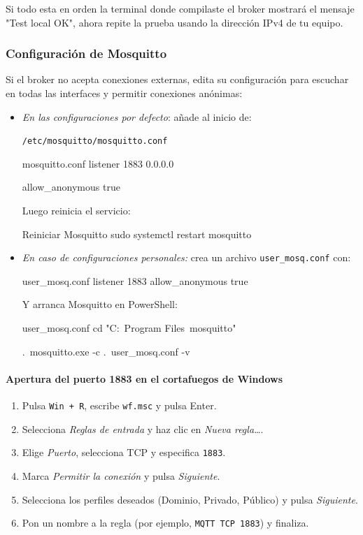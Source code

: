 \documentclass[12pt, a4paper]{article}
\begin{document}
\begin{umaappendices}
		Si todo esta en orden la terminal donde compilaste el broker mostrará el mensaje "Test local OK", ahora repite la prueba usando la dirección IPv4 de tu equipo.
		
		\subsubsection{Configuración de Mosquitto}
		Si el broker no acepta conexiones externas, edita su configuración para escuchar en todas las interfaces y permitir conexiones anónimas:
		
		\begin{itemize}
			\item  \textit{En las configuraciones por defecto}: añade al inicio de:
			
			\texttt{/etc/mosquitto/}\texttt{mosquitto.conf}
			\begin{Terminal}{mosquitto.conf}
				listener 1883 0.0.0.0 
				 
				allow\_anonymous true
			\end{Terminal}
			Luego reinicia el servicio:
			\begin{Terminal}{Reiniciar Mosquitto}
				sudo systemctl restart mosquitto
			\end{Terminal}
			
			\item \textit{En caso de configuraciones personales:} crea un archivo \texttt{user\_mosq.conf} con:
			\begin{Terminal}{user\_mosq.conf}
				listener 1883  
				allow\_anonymous true
			\end{Terminal}
			Y arranca Mosquitto en PowerShell:
			\begin{Terminal}{user\_mosq.conf}
				cd "C:\ Program Files\ mosquitto"  
				
				.\ mosquitto.exe -c .\ user\_mosq.conf -v
			\end{Terminal}
		\end{itemize}
		
		\paragraph{Apertura del puerto 1883 en el cortafuegos de Windows}
			\begin{enumerate}
				\item Pulsa \texttt{Win + R}, escribe \texttt{wf.msc} y pulsa Enter.
				\item Selecciona \textit{Reglas de entrada} y haz clic en \textit{Nueva regla…}.
				\item Elige \textit{Puerto}, selecciona TCP y especifica \texttt{1883}.
				\item Marca \textit{Permitir la conexión} y pulsa \textit{Siguiente}.
				\item Selecciona los perfiles deseados (Dominio, Privado, Público) y pulsa \textit{Siguiente}.
				\item Pon un nombre a la regla (por ejemplo, \texttt{MQTT TCP 1883}) y finaliza.
			\end{enumerate}


\end{umaappendices}
\end{document}
